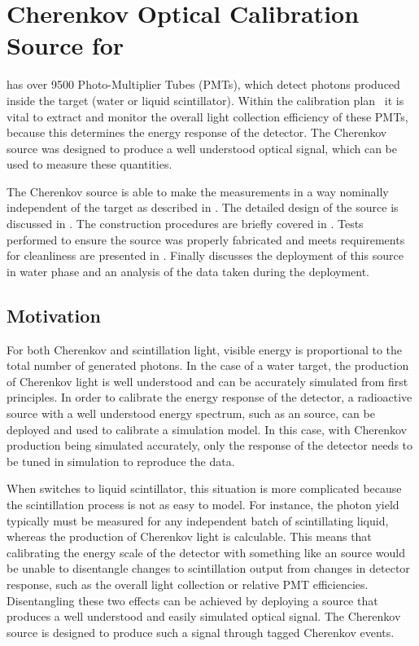 \renewcommand{\bf}{\bfseries}

\chapter{Cherenkov Optical Calibration Source for {\snop}}
\label{ch:chsrc}

{\snop} has over 9500 Photo-Multiplier Tubes (PMTs), which detect photons produced inside the target (water or liquid scintillator).
Within the {\snop} calibration plan~\cite{gann:2013} it is vital to extract and monitor the overall light collection efficiency of these PMTs, because this determines the energy response of the detector.
The Cherenkov source was designed to produce a well understood optical signal, which can be used to measure these quantities.

The Cherenkov source is able to make the measurements in a way nominally independent of the target as described in . 
The detailed design of the source is discussed in . 
The construction procedures are briefly covered in .
Tests performed to ensure the source was properly fabricated and meets {\snop} requirements for cleanliness are presented in .
Finally  discusses the deployment of this source in {\snop} water phase and an analysis of the data taken during the deployment.

\section{Motivation}
\label{chap:motivation}

For both Cherenkov and scintillation light, visible energy is proportional to the total number of generated photons.
In the case of a water target, the production of Cherenkov light is well understood and can be accurately simulated from first principles.
In order to calibrate the energy response of the detector, a radioactive source with a well understood energy spectrum, such as an \N source, can be deployed and used to calibrate a simulation model.
In this case, with Cherenkov production being simulated accurately, only the response of the detector needs to be tuned in simulation to reproduce the data.

When {\snop} switches to liquid scintillator, this situation is more complicated because the scintillation process is not as easy to model.
For instance, the photon yield typically must be measured for any independent batch of scintillating liquid, whereas the production of Cherenkov light is calculable. 
This means that calibrating the energy scale of the detector with something like an \N source would be unable to disentangle changes to scintillation output from changes in detector response, such as the overall light collection or relative PMT efficiencies.
Disentangling these two effects can be achieved by deploying a source that produces a well understood and easily simulated optical signal. 
The Cherenkov source is designed to produce such a signal through tagged Cherenkov events.


